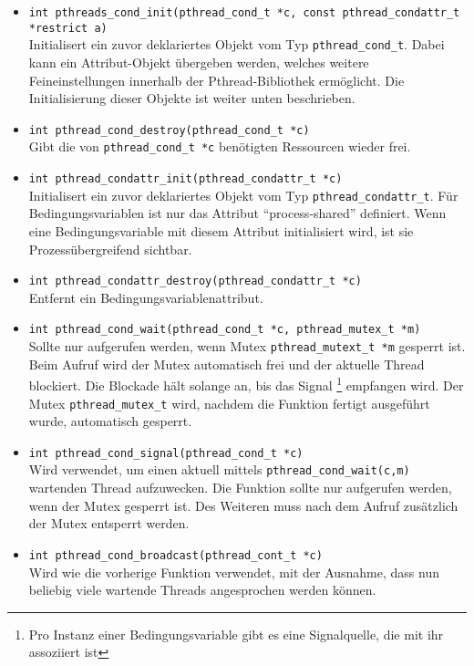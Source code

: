 \documentclass[11pt,a4paper]{article}
\begin{document}
\begin{itemize}
	\item \lstinline$int pthreads_cond_init(pthread_cond_t *c, const pthread_condattr_t *restrict a)$ \\
	Initialisert ein zuvor deklariertes Objekt vom Typ \lstinline$pthread_cond_t$. 
	Dabei kann ein Attribut-Objekt übergeben werden, welches weitere Feineinstellungen innerhalb
	der Pthread-Bibliothek ermöglicht. 
	Die Initialisierung dieser Objekte ist weiter unten beschrieben.

	\item \lstinline$int pthread_cond_destroy(pthread_cond_t *c)$ \\
	Gibt die von \lstinline$pthread_cond_t *c$ benötigten Ressourcen wieder frei.

	\item \lstinline$int pthread_condattr_init(pthread_condattr_t *c)$\\
	Initialisert ein zuvor deklariertes Objekt vom Typ \lstinline$pthread_condattr_t$. 
	Für Bedingungsvariablen ist nur das Attribut ``process-shared'' definiert. 
	Wenn eine Bedingungsvariable mit diesem Attribut initialisiert wird, ist sie Prozessübergreifend sichtbar.

	\item \lstinline$int pthread_condattr_destroy(pthread_condattr_t *c)$\\
	Entfernt ein Bedingungsvariablenattribut.

	\item \lstinline$int pthread_cond_wait(pthread_cond_t *c, pthread_mutex_t *m)$ \\
	Sollte nur aufgerufen werden, wenn Mutex \lstinline$pthread_mutext_t *m$ gesperrt ist. Beim Aufruf wird der Mutex automatisch frei und der aktuelle Thread blockiert. 
	Die Blockade hält solange an, bis das Signal \footnote{Pro Instanz einer Bedingungsvariable gibt es eine Signalquelle, die mit ihr assoziiert ist} empfangen wird.
	Der Mutex \lstinline$pthread_mutex_t$ wird, nachdem die Funktion fertigt ausgeführt wurde, automatisch gesperrt.

	\item \lstinline$int pthread_cond_signal(pthread_cond_t *c)$ \\
	Wird verwendet, um einen aktuell mittels \lstinline$pthread_cond_wait(c,m)$ wartenden Thread aufzuwecken. 
	Die Funktion sollte nur aufgerufen werden, wenn der Mutex gesperrt ist. 
	Des Weiteren muss nach dem Aufruf zusätzlich der Mutex entsperrt werden.

	\item \lstinline$int pthread_cond_broadcast(pthread_cont_t *c)$\\
	Wird wie die vorherige Funktion verwendet, mit der Ausnahme, dass nun beliebig viele wartende Threads angesprochen werden können.

\end{itemize}
\end{document}
